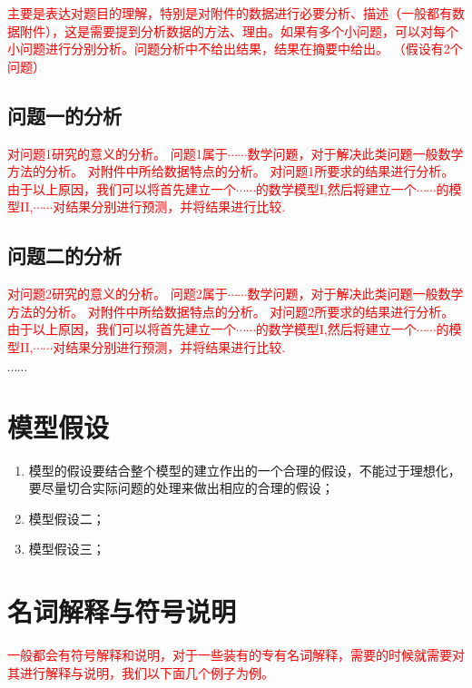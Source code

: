 \documentclass[12pt,a4paper]{nmmcm}
\begin{document}
\textcolor{red}{主要是表达对题目的理解，特别是对附件的数据进行必要分析、描述（一般都有数据附件），这是需要提到分析数据的方法、理由。如果有多个小问题，可以对每个小问题进行分别分析。问题分析中不给出结果，结果在摘要中给出。
（假设有2个问题）}

\subsection{问题一的分析}

 \textcolor{red}{对问题1研究的意义的分析。
问题1属于$\cdots\cdots$数学问题，对于解决此类问题一般数学方法的分析。
对附件中所给数据特点的分析。
对问题1所要求的结果进行分析。
由于以上原因，我们可以将首先建立一个$\cdots\cdots$的数学模型I,然后将建立一个$\cdots\cdots$的模型II,$\cdots\cdots$对结果分别进行预测，并将结果进行比较.
}


\subsection{问题二的分析}
 \textcolor{red}{对问题2研究的意义的分析。
问题2属于$\cdots\cdots$数学问题，对于解决此类问题一般数学方法的分析。
对附件中所给数据特点的分析。
对问题2所要求的结果进行分析。
由于以上原因，我们可以将首先建立一个$\cdots\cdots$的数学模型I,然后将建立一个$\cdots\cdots$的模型II,$\cdots\cdots$对结果分别进行预测，并将结果进行比较.
}

 $\cdots\cdots$


\section{模型假设}
\begin{enumerate}
  \item 模型的假设要结合整个模型的建立作出的一个合理的假设，不能过于理想化，要尽量切合实际问题的处理来做出相应的合理的假设；
  \item 模型假设二；
  \item 模型假设三；
\end{enumerate}

\section{名词解释与符号说明}

\textcolor{red}{一般都会有符号解释和说明，对于一些装有的专有名词解释，需要的时候就需要对其进行解释与说明，我们以下面几个例子为例。}
\end{document}
